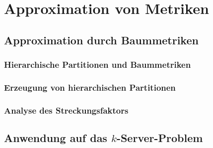 \chapter{Approximation von Metriken}


\section{Approximation durch Baummetriken}

\subsection{Hierarchische Partitionen und Baummetriken}

\subsection{Erzeugung von hierarchischen Partitionen}

\subsection{Analyse des Streckungsfaktors}


\section{Anwendung auf das $k$-Server-Problem}
